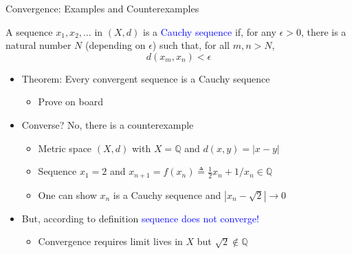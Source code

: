 \documentclass[10pt,english]{beamer}
\begin{document}
\begin{frame}{Convergence: Examples and Counterexamples}

\begin{definition}
A sequence $x_1,x_2,\ldots$ in $(X,d)$ is a \textcolor{blue}{Cauchy sequence} if, for any $\epsilon >0$, there is a natural number $N$ (depending on $\epsilon$) such that, for all $m,n > N$,\vspace{-2mm}
\begin{equation*}
d \left( x_m, x_n \right) < \epsilon
\end{equation*}
\end{definition}

\begin{itemize}
\setlength\itemsep{3mm}
\item<1-> Theorem: Every convergent sequence is a Cauchy sequence \vspace{1mm}
\begin{itemize} 
  \setlength\itemsep{1.5mm}
  \item Prove on board \pause
\end{itemize}
\item Converse? \pause No, there is a counterexample \vspace{1mm}
\begin{itemize} 
  \setlength\itemsep{1.5mm}
  \item Metric space $(X,d)$ with $X=\mathbb{Q}$ and $d(x,y)=|x-y|$
  \item Sequence $x_1 = 2$ and $x_{n+1} = f(x_n) \triangleq \frac{1}{2} x_n + 1/x_n \in \mathbb{Q} $
  \item One can show $x_n$ is a Cauchy sequence and $|x_n - \sqrt{2}|\to 0$
\end{itemize}
\item<4-> But, according to definition \textcolor{blue}{sequence does not converge!}  \vspace{1mm}
\begin{itemize} 
  \setlength\itemsep{1.5mm}
  \item Convergence requires limit lives in $X$ but $\sqrt{2} \notin \mathbb{Q}$
\end{itemize}
\end{itemize}
\end{frame}
\end{document}
